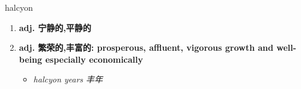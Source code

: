 
\begin{frame}
{\huge halcyon}
\begin{center}
\begin{enumerate}\Large
  \item \textbf{adj. 宁静的,平静的}
  \item \textbf{adj. 繁荣的,丰富的: prosperous, affluent, vigorous growth and well-being especially economically}
  \begin{itemize}
    \item \em{\Large{halcyon years 丰年}}
  \end{itemize}
\end{enumerate}
\end{center}
\end{frame}

